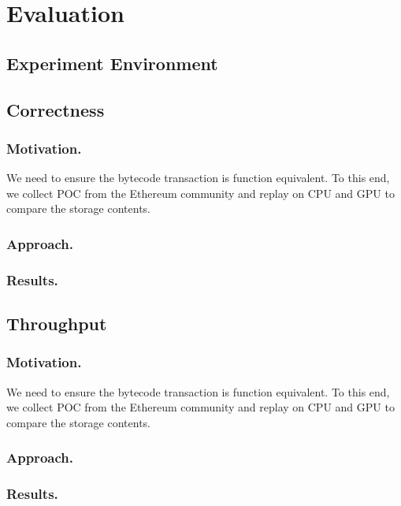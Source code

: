 \section{Evaluation}

\subsection{Experiment Environment}


\subsection{Correctness}

\subsubsection{Motivation.}
We need to ensure the bytecode transaction is function equivalent. To this end, we collect POC from the Ethereum community and replay on CPU and GPU to compare the storage contents. 
\subsubsection{Approach.}

\subsubsection{Results.}


\subsection{Throughput}

\subsubsection{Motivation.}
We need to ensure the bytecode transaction is function equivalent. To this end, we collect POC from the Ethereum community and replay on CPU and GPU to compare the storage contents. 

\subsubsection{Approach.}

\subsubsection{Results.}